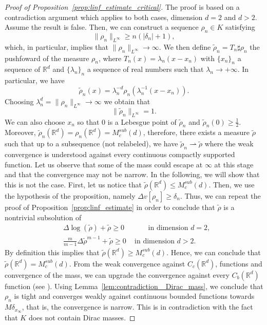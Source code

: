 \documentclass[11pt,a4paper]{article}
\numberwithin{equation}{section}
\newcommand{\R}{{\mathbb{R}}}
\theoremstyle{plain}
\theoremstyle{remark}
\newcommand {\f}{\frac}
\begin{document}
\begin{proof}[Proof of Proposition~\ref{prop:linf_estimate_critical}]
The proof is based on a contradiction argument which applies to both cases, dimension $d=2$ and $d>2$. Assume the result is false. Then, we can construct a sequence $\rho_{n}\in K$ satisfying 
$$
\|\rho_{n}\|_{L^{\infty}}\ge n(|\delta_n| +1),
$$
which,  in particular, implies that $\|\rho_{n}\|_{L^{\infty}}\to\infty$.
We then define $\tilde{\rho}_{n}=T_{n}\sharp\rho_n$ the pushfoward of the measure $\rho_n$, where $T_n(x) = \lambda_n (x-x_n)$ with $\{x_n\}_n$ a sequence of $\R^d$  and $\{\lambda_n\}_n$ a sequence of real numbers such that $\lambda_n\to +\infty$. In particular, we have
$$
\tilde{\rho}_{n}(x) = \lambda_n^{-d} \rho_{n}(\lambda_n^{-1}(x-x_n)) .
$$
Choosing $\lambda_n^{d}= \|\rho_n\|_{L^{\infty}}\to\infty$ we obtain that
$$
\|\tilde{\rho}_n\|_{L^{\infty}}=1.
$$
We can also choose $x_n$ so that $0$ is a Lebesgue point of $\tilde{\rho}_n$ and $\tilde{\rho}_{n}(0)\ge \frac{1}{2}$.
Moreover, $\tilde{\rho}_{n}(\R^d) = \rho_n(\R^d)= M^{sub}_c(d)$, therefore, there exists a measure $\tilde{\rho}$ such that up to a subsequence (not relabeled), we have $
\tilde{\rho}_{n}\rightharpoonup\tilde{\rho}
$
where the weak convergence is understood against every continuous compactly supported function. Let us observe that some of the mass could escape at $\infty$ at this stage and that the convergence may not be narrow. In the following, we will show that this is not the case. First, let us notice that 
$\tilde{\rho}(\R^d)\le M^{sub}_c(d)$. Then, we use the hypothesis of the proposition, namely $\Delta v[\rho_n]\ge \delta_n$. Thus, we can repeat  the proof of Proposition~\ref{prop:linf_estimate} in order to conclude that $\tilde\rho$ is a nontrivial subsolution of 
\begin{align*}
&\Delta\log(\tilde{\rho}) + \tilde{\rho}\ge 0 \qquad \quad \, \, \text{in dimension $d=2$}, \\
&\f{m}{m-1}\Delta\tilde{\rho}^{m-1}+\tilde{\rho}\ge 0 \quad \, \text{in dimension $d>2$}.
\end{align*}
By definition this implies that $\tilde{\rho}(\R^d)\ge M^{sub}_c(d)$. Hence, we can conclude that $\tilde{\rho}(\R^d)=M^{sub}_c(d)$. From the weak convergence against $C_c(\R^d)$, functions and convergence of the mass, we can upgrade the convergence against every $C_{b}(\R^d)$ function (see \cite[Lemma 5.8]{Santambrogio15}). Using Lemma~\ref{lem:contradiction_ Dirac_mass}, we conclude that $\rho_{n}$ is tight and converges weakly against continuous bounded functions towards $M\delta_{x_{\infty}}$, that is, the convergence is narrow. This is in contradiction with the fact that $K$ does not contain Dirac masses. 
\end{proof}
\end{document}
